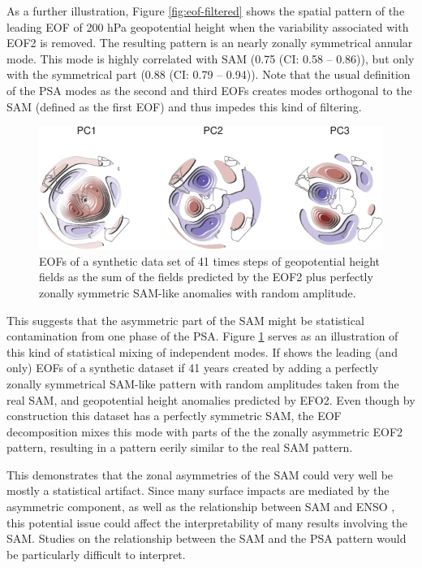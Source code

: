 \documentclass[smallextended]{svjour3}       %
\begin{document}
As a further illustration, Figure \ref{fig:eof-filtered} shows the spatial pattern of the leading EOF of 200 hPa geopotential height when the variability associated with EOF2 is removed. The resulting pattern is an nearly zonally symmetrical annular mode. This mode is highly correlated with SAM (0.75 (CI: 0.58 -- 0.86)), but only with the symmetrical part (0.88 (CI: 0.79 -- 0.94)). Note that the usual definition of the PSA modes as the second and third EOFs creates modes orthogonal to the SAM (defined as the first EOF) and thus impedes this kind of filtering.



\begin{figure}
\centering
\includegraphics{../figures/fake-eof-1.pdf}
\caption{\label{fig:fake-eof}EOFs of a synthetic data set of 41 times steps of geopotential height fields as the sum of the fields predicted by the EOF2 plus perfectly zonally symmetric SAM-like anomalies with random amplitude.}
\end{figure}

This suggests that the asymmetric part of the SAM might be statistical contamination from one phase of the PSA. Figure \ref{fig:fake-eof} serves as an illustration of this kind of statistical mixing of independent modes. If shows the leading (and only) EOFs of a synthetic dataset if 41 years created by adding a perfectly zonally symmetrical SAM-like pattern with random amplitudes taken from the real SAM, and geopotential height anomalies predicted by EFO2. Even though by construction this dataset has a perfectly symmetric SAM, the EOF decomposition mixes this mode with parts of the the zonally asymmetric EOF2 pattern, resulting in a pattern eerily similar to the real SAM pattern.

This demonstrates that the zonal asymmetries of the SAM could very well be mostly a statistical artifact. Since many surface impacts are mediated by the asymmetric component, as well as the relationship between SAM and ENSO \citep{campitelli2021}, this potential issue could affect the interpretability of many results involving the SAM. Studies on the relationship between the SAM and the PSA pattern would be particularly difficult to interpret.
\end{document}
